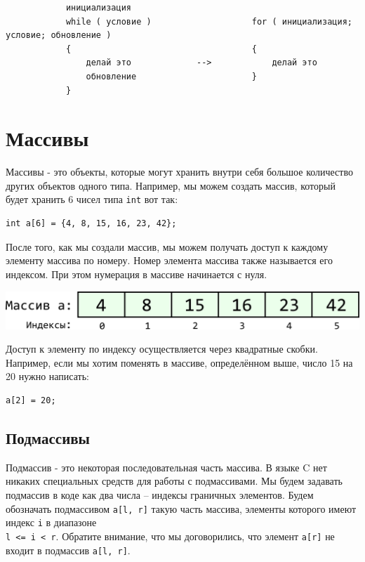 \documentclass{article}
\begin{document}
\begin{lstlisting}
            инициализация
            while ( условие )                    for ( инициализация; условие; обновление )
            {                                    {        
                делай это             -->            делай это                       
                обновление                       }                     
            }                                                
\end{lstlisting}


\newpage
\section*{Массивы}
Массивы - это объекты, которые могут хранить внутри себя большое количество других объектов одного типа.
Например, мы можем создать массив, который будет хранить 6 чисел типа \texttt{int} вот так:

\lstset{
  xleftmargin=.3\textwidth, xrightmargin=.2\textwidth
}
\begin{lstlisting}
int a[6] = {4, 8, 15, 16, 23, 42};
\end{lstlisting}

После того, как мы создали массив, мы можем получать доступ к каждому элементу массива по номеру. Номер
элемента массива также называется его индексом. При этом нумерация в массиве начинается с нуля.
\begin{center}
\includegraphics[scale=0.8]{../images/array_indexes.png}
\end{center}
Доступ к элементу по индексу осуществляется через квадратные скобки. Например, если мы хотим поменять в массиве, определённом выше, число 15 на 20 нужно написать:
\begin{lstlisting}
a[2] = 20;
\end{lstlisting}



\subsection*{Подмассивы}
Подмассив - это некоторая последовательная часть массива. В языке C нет никаких специальных средств для работы с подмассивами. Мы будем задавать подмассив в коде как два числа -- индексы граничных элементов. Будем обозначать подмассивом \texttt{a[l, r]} такую часть массива, элементы которого имеют индекс \texttt{i} в диапазоне \\
\texttt{l <= i < r}. Обратите внимание, что мы договорились, что элемент \texttt{a[r]} не входит в подмассив \texttt{a[l, r]}.\\
\end{document}
